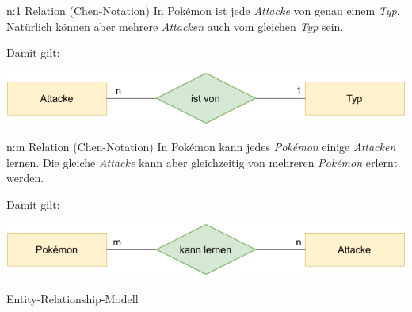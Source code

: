 \begin{example}{n:1 Relation (Chen-Notation)}
    In Pokémon ist jede \emph{Attacke} von genau einem \emph{Typ}.
    Natürlich können aber mehrere \emph{Attacken} auch vom gleichen \emph{Typ} sein.

    Damit gilt:
    \begin{center}
        \includegraphics[width=0.7\linewidth]{includes/figures/example_entity_relationship_modell_chen_many_to_one.pdf}
    \end{center}
\end{example}

\begin{example}{n:m Relation (Chen-Notation)}
    In Pokémon kann jedes \emph{Pokémon} einige \emph{Attacken} lernen.
    Die gleiche \emph{Attacke} kann aber gleichzeitig von mehreren \emph{Pokémon} erlernt werden.

    Damit gilt:
    \begin{center}
        \includegraphics[width=0.7\linewidth]{includes/figures/example_entity_relationship_modell_chen_many_to_many.pdf}
    \end{center}
\end{example}

\begin{example}{Entity-Relationship-Modell}

\end{example}

\begin{example}{}

\end{example}
